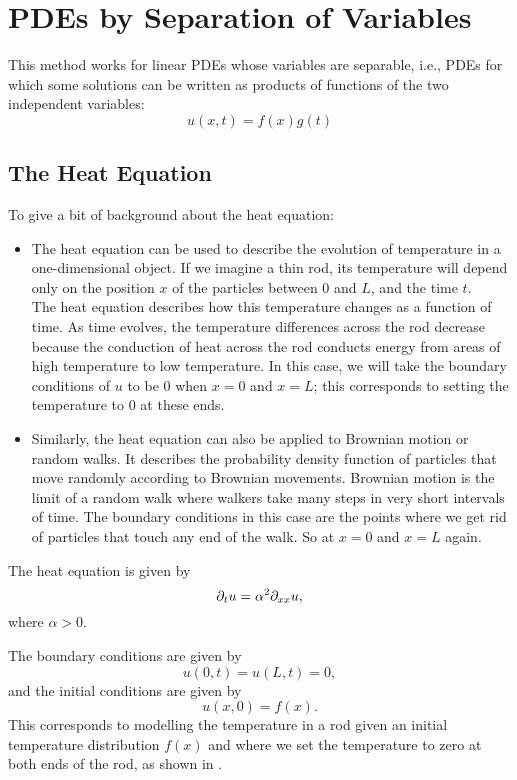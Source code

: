 \section{PDEs by Separation of Variables}

This method works for linear PDEs whose variables are separable, i.e., PDEs for which some solutions can be written as products of functions of the two independent variables:
\[
u(x,t) = f(x)g(t)
\]

\subsection{The Heat Equation}

To give a bit of background about the heat equation:
\begin{itemize}
	\item The heat equation can be used to describe the evolution of temperature in a one-dimensional object. If we imagine a thin rod, its temperature will depend only on the position $x$ of the particles between $0$ and $L$, and the time $t$. \\
	The heat equation describes how this temperature changes as a function of time. As time evolves, the temperature differences across the rod decrease because the conduction of heat across the rod conducts energy from areas of high temperature to low temperature. In this case, we will take the boundary conditions of $u$ to be 0 when $x=0$ and $x=L$; this corresponds to setting the temperature to 0 at these ends.
	
	\item Similarly, the heat equation can also be applied to Brownian motion or random walks. It describes the probability density function of particles that move randomly according to Brownian movements. Brownian motion is the limit of a random walk where walkers take many steps in very short intervals of time. The boundary conditions in this case are the points where we get rid of particles that touch any end of the walk. So at $x=0$ and $x=L$ again.
\end{itemize}

The heat equation is given by 
\begin{equation}\label{eq5.1}
	\partial_t u = \alpha^2 \partial_{xx} u,
\end{equation} 
where $\alpha > 0$.

The boundary conditions are given by
\[
u(0,t) = u(L,t) = 0,
\]
and the initial conditions are given by
\[
u(x,0) = f(x).
\]
This corresponds to modelling the temperature in a rod given an initial temperature distribution $f(x)$ and where we set the temperature to zero at both ends of the rod, as shown in .

